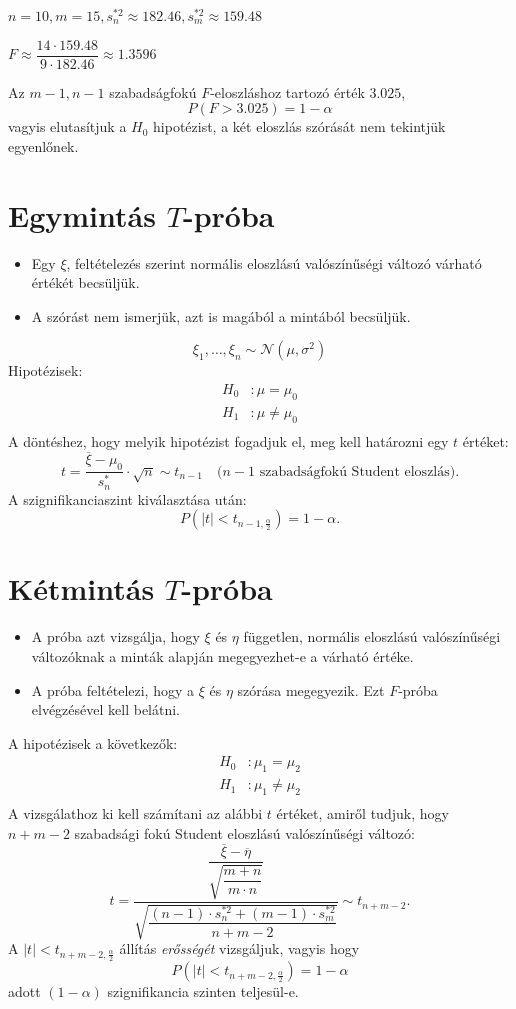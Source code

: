 \documentclass[a4paper]{article}
\begin{document}
\bigskip

$n = 10, m = 15, s_n^{*2} \approx 182.46, s_m^{*2} \approx 159.48$

$F \approx \dfrac{14 \cdot 159.48}{9 \cdot 182.46} \approx 1.3596$

Az $m - 1, n - 1$ szabadságfokú $F$-eloszláshoz tartozó érték $3.025$,
\[
P(F > 3.025) = 1 - \alpha
\]
vagyis elutasítjuk a $H_0$ hipotézist, a két eloszlás szórását nem tekintjük egyenlőnek.

\section{Egymintás $T$-próba}

\begin{itemize}
\item Egy $\xi$, feltételezés szerint normális eloszlású valószínűségi változó várható értékét becsüljük.
\item A szórást nem ismerjük, azt is magából a mintából becsüljük.
\end{itemize}
\[
\xi_1, \ldots, \xi_n \sim \mathcal{N}(\mu, \sigma^2)
\]
Hipotézisek:
\begin{align*}
H_0 &: \mu = \mu_0 \\
H_1 &: \mu \neq \mu_0 \\
\end{align*}
A döntéshez, hogy melyik hipotézist fogadjuk el, meg kell határozni egy $t$ értéket:
\[
t = \dfrac{\overline{\xi} - \mu_0}{s_n^*} \cdot \sqrt{n}
\sim t_{n-1} \quad \text{($n - 1$ szabadságfokú Student eloszlás)}.
\]
A szignifikanciaszint kiválasztása után:
\[
P\left(|t| < t_{n-1, \frac{\alpha}{2}}\right) = 1 - \alpha.
\]

\section{Kétmintás $T$-próba}

\begin{itemize}
\item A próba azt vizsgálja, hogy $\xi$ és $\eta$ független, normális eloszlású valószínűségi változóknak a minták alapján megegyezhet-e a várható értéke.
\item A próba feltételezi, hogy a $\xi$ és $\eta$ szórása megegyezik. Ezt $F$-próba elvégzésével kell belátni.
\end{itemize}
A hipotézisek a következők:
\begin{align*}
H_0 &: \mu_1 = \mu_2 \\
H_1 &: \mu_1 \neq \mu_2 \\
\end{align*}
A vizsgálathoz ki kell számítani az alábbi $t$ értéket, amiről tudjuk, hogy $n + m - 2$ szabadsági fokú Student eloszlású valószínűségi változó:
\[
t =
\dfrac{\dfrac{\overline{\xi} - \overline{\eta}}{\sqrt{\dfrac{m + n}{m \cdot n}}}}
{\sqrt{
\dfrac{(n - 1) \cdot s_n^{*2} + (m - 1) \cdot s_m^{*2}}
{n + m - 2}
}}
\sim
t_{n + m - 2}.
\]
A $|t| < t_{n + m - 2, \frac{\alpha}{2}}$ állítás \textit{erősségét} vizsgáljuk, vagyis hogy
\[
P\left(
|t| < t_{n + m - 2, \frac{\alpha}{2}}
\right) = 1 - \alpha
\]
adott $(1 - \alpha)$ szignifikancia szinten teljesül-e.
\end{document}
